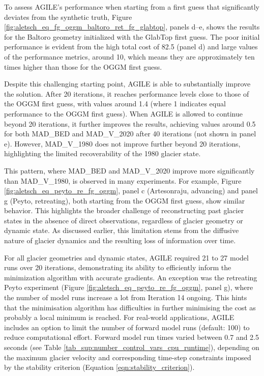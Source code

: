 \documentclass[journal abbreviation, manuscript]{copernicus}
\begin{document}
To assess AGILE’s performance when starting from a first guess that significantly deviates from the synthetic truth, Figure \ref{fig:aletsch_eq_fg_oggm_baltoro_ret_fg_glabtop}, panels d–e, shows the results for the Baltoro geometry initialized with the GlabTop first guess. The poor initial performance is evident from the high total cost of 82.5 (panel d) and large values of the performance metrics, around 10, which means they are approximately ten times higher than those for the OGGM first guess.

Despite this challenging starting point, AGILE is able to substantially improve the solution. After 20 iterations, it reaches performance levels close to those of the OGGM first guess, with values around 1.4 (where 1 indicates equal performance to the OGGM first guess). When AGILE is allowed to continue beyond 20 iterations, it further improves the results, achieving values around 0.5 for both MAD\_BED and MAD\_V\_2020 after 40 iterations (not shown in panel e). However, MAD\_V\_1980 does not improve further beyond 20 iterations, highlighting the limited recoverability of the 1980 glacier state.

This pattern, where MAD\_BED and MAD\_V\_2020 improve more significantly than MAD\_V\_1980, is observed in many experiments. For example, Figure \ref{fig:aletsch_eq_peyto_re_fg_oggm}, panel c (Artesonraju, advancing) and panel g (Peyto, retreating), both starting from the OGGM first guess, show similar behavior. This highlights the broader challenge of reconstructing past glacier states in the absence of direct observations, regardless of glacier geometry or dynamic state. As discussed earlier, this limitation stems from the diffusive nature of glacier dynamics and the resulting loss of information over time.

For all glacier geometries and dynamic states, AGILE required 21 to 27 model runs over 20 iterations, demonstrating its ability to efficiently inform the minimization algorithm with accurate gradients. An exception was the retreating Peyto experiment (Figure \ref{fig:aletsch_eq_peyto_re_fg_oggm}, panel g), where the number of model runs increase a lot from Iteration 14 ongoing. This hints that the minimisation algorithm has difficulties in further minimising the cost as probably a local minimum is reached. For real-world applications, AGILE includes an option to limit the number of forward model runs (default: 100) to reduce computational effort. Forward model run times varied between 0.7 and 2.5 seconds (see Table \ref{tab_sup:number_control_vars_cpu_runtime}), depending on the maximum glacier velocity and corresponding time-step constraints imposed by the stability criterion (Equation \ref{eqn:stability_criterion}).
\end{document}
